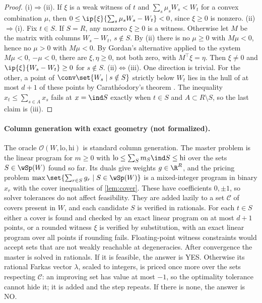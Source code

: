 \begin{proof}
(i)$\Rightarrow$(ii). If $\xi$ is a weak witness of $t$ and $\sum_s\mu_sW_s<W_t$ for a convex combination $\mu$, then $0\le\ip{\xi}{\sum_s\mu_sW_s-W_t}<0$, since $\xi\ge0$ is nonzero. (ii)$\Rightarrow$(i). Fix $t\in S$. If $S=R$, any nonzero $\xi\ge0$ is a witness. Otherwise let $M$ be the matrix with columns $W_s-W_t$, $s\notin S$. By (ii) there is no $\mu\ge0$ with $M\mu<0$, hence no $\mu>0$ with $M\mu<0$. By Gordan's alternative \citep[Ch.~2, Thm.~2.4.5]{Mangasarian1969} applied to the system $M\mu<0$, $-\mu<0$, there are $\xi,\eta\ge0$, not both zero, with $M^\top\xi=\eta$. Then $\xi\ne0$ and $\ip{\xi}{W_s-W_t}\ge0$ for $s\notin S$. (ii)$\Leftrightarrow$(iii). One direction is trivial. For the other, a point of $\conv\set{W_s\mid s\notin S}$ strictly below $W_t$ lies in the hull of at most $d+1$ of these points by Carath\'eodory's theorem \citep[Thm.~17.1]{Rockafellar1970}. The inequality $x_t\le\sum_{s\in A}x_s$ fails at $x=\ind S$ exactly when $t\in S$ and $A\subset R\setminus S$, so the last claim is (iii).
\end{proof}

\paragraph{Column generation with exact geometry (not formalized).}
The oracle $\mathcal O(W,\mathrm{lo},\mathrm{hi})$ is standard column generation. The master problem is the linear program for $m\ge0$ with $\mathrm{lo}\le\sum_Sm_S\ind S\le\mathrm{hi}$ over the sets $S\in\wSp(W)$ found so far. Its duals give weights $g\in\R^R$, and the pricing problem $\max\set{\sum_{r\in S}g_r\mid S\in\wSp(W)}$ is a mixed-integer program in binary $x_r$ with the cover inequalities of \cref{lem:cover}. These have coefficients $0,\pm1$, so solver tolerances do not affect feasibility. They are added lazily to a set $\mathcal C$ of covers present in $W$, and each candidate $S$ is verified in rationals. For each $t\in S$ either a cover is found and checked by an exact linear program on at most $d+1$ points, or a rounded witness $\xi$ is verified by substitution, with an exact linear program over all points if rounding fails. Floating-point witness constraints would accept sets that are not weakly reachable at degeneracies. After convergence the master is solved in rationals. If it is feasible, the answer is YES. Otherwise its rational Farkas vector $\lambda$, scaled to integers, is priced once more over the sets respecting $\mathcal C$: an improving set has value at most $-1$, so the optimality tolerance cannot hide it; it is added and the step repeats. If there is none, the answer is NO.

